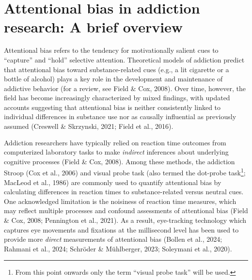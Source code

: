 \documentclass[authordate, empirical]{jote-new-article}
\author[1]{\mbox{Amber Copeland\orcid{0000-0003-4634-3343}}}
\affil[1]{University of Sheffield, Sheffield, England}
\begin{document}
\begin{frontmatter}
  \maketitle
  \begin{abstract}
    \printabstracttext
  \end{abstract}
\end{frontmatter}



	\section{Attentional bias in addiction research: A brief overview}



	Attentional bias refers to the tendency for motivationally salient cues to “capture” and “hold”\emph{ }selective attention. Theoretical models of addiction predict that attentional bias toward substance-related cues (e.g., a lit cigarette or a bottle of alcohol) plays a key role in the development and maintenance of addictive behavior (for a review, see Field \& Cox, 2008). Over time, however, the field has become increasingly characterized by mixed findings, with updated accounts suggesting that attentional bias is neither consistently linked to individual differences in substance use nor as causally influential as previously assumed (Creswell \& Skrzynski, 2021; Field et al., 2016).



	Addiction researchers have typically relied on reaction time outcomes from computerized laboratory tasks to make \emph{indirect} inferences about underlying cognitive processes (Field \& Cox, 2008). Among these methods, the addiction Stroop (Cox et al., 2006) and visual probe task (also termed the dot-probe task\footnote{ From this point onwards only the term “visual probe task” will be used.}; MacLeod et al., 1986) are commonly used to quantify attentional bias by calculating differences in reaction times to substance-related versus neutral cues. One acknowledged limitation is the noisiness of reaction time measures, which may reflect multiple processes and confound assessments of attentional bias (Field \& Cox, 2008; Pennington et al., 2021). As a result, eye-tracking technology which captures eye movements and fixations at the millisecond level has been used to provide more \emph{direct }measurements of attentional bias (Bollen et al., 2024; Rahmani et al., 2024; Schröder \& Mühlberger, 2023; Soleymani et al., 2020).
\end{document}
